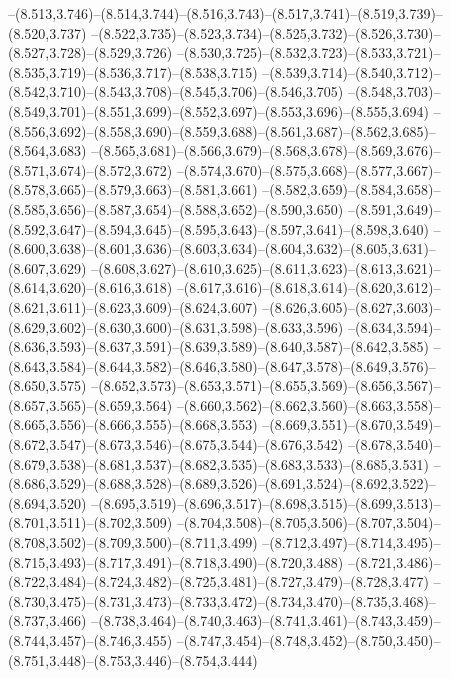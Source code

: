   --(8.513,3.746)--(8.514,3.744)--(8.516,3.743)--(8.517,3.741)--(8.519,3.739)--(8.520,3.737)%
  --(8.522,3.735)--(8.523,3.734)--(8.525,3.732)--(8.526,3.730)--(8.527,3.728)--(8.529,3.726)%
  --(8.530,3.725)--(8.532,3.723)--(8.533,3.721)--(8.535,3.719)--(8.536,3.717)--(8.538,3.715)%
  --(8.539,3.714)--(8.540,3.712)--(8.542,3.710)--(8.543,3.708)--(8.545,3.706)--(8.546,3.705)%
  --(8.548,3.703)--(8.549,3.701)--(8.551,3.699)--(8.552,3.697)--(8.553,3.696)--(8.555,3.694)%
  --(8.556,3.692)--(8.558,3.690)--(8.559,3.688)--(8.561,3.687)--(8.562,3.685)--(8.564,3.683)%
  --(8.565,3.681)--(8.566,3.679)--(8.568,3.678)--(8.569,3.676)--(8.571,3.674)--(8.572,3.672)%
  --(8.574,3.670)--(8.575,3.668)--(8.577,3.667)--(8.578,3.665)--(8.579,3.663)--(8.581,3.661)%
  --(8.582,3.659)--(8.584,3.658)--(8.585,3.656)--(8.587,3.654)--(8.588,3.652)--(8.590,3.650)%
  --(8.591,3.649)--(8.592,3.647)--(8.594,3.645)--(8.595,3.643)--(8.597,3.641)--(8.598,3.640)%
  --(8.600,3.638)--(8.601,3.636)--(8.603,3.634)--(8.604,3.632)--(8.605,3.631)--(8.607,3.629)%
  --(8.608,3.627)--(8.610,3.625)--(8.611,3.623)--(8.613,3.621)--(8.614,3.620)--(8.616,3.618)%
  --(8.617,3.616)--(8.618,3.614)--(8.620,3.612)--(8.621,3.611)--(8.623,3.609)--(8.624,3.607)%
  --(8.626,3.605)--(8.627,3.603)--(8.629,3.602)--(8.630,3.600)--(8.631,3.598)--(8.633,3.596)%
  --(8.634,3.594)--(8.636,3.593)--(8.637,3.591)--(8.639,3.589)--(8.640,3.587)--(8.642,3.585)%
  --(8.643,3.584)--(8.644,3.582)--(8.646,3.580)--(8.647,3.578)--(8.649,3.576)--(8.650,3.575)%
  --(8.652,3.573)--(8.653,3.571)--(8.655,3.569)--(8.656,3.567)--(8.657,3.565)--(8.659,3.564)%
  --(8.660,3.562)--(8.662,3.560)--(8.663,3.558)--(8.665,3.556)--(8.666,3.555)--(8.668,3.553)%
  --(8.669,3.551)--(8.670,3.549)--(8.672,3.547)--(8.673,3.546)--(8.675,3.544)--(8.676,3.542)%
  --(8.678,3.540)--(8.679,3.538)--(8.681,3.537)--(8.682,3.535)--(8.683,3.533)--(8.685,3.531)%
  --(8.686,3.529)--(8.688,3.528)--(8.689,3.526)--(8.691,3.524)--(8.692,3.522)--(8.694,3.520)%
  --(8.695,3.519)--(8.696,3.517)--(8.698,3.515)--(8.699,3.513)--(8.701,3.511)--(8.702,3.509)%
  --(8.704,3.508)--(8.705,3.506)--(8.707,3.504)--(8.708,3.502)--(8.709,3.500)--(8.711,3.499)%
  --(8.712,3.497)--(8.714,3.495)--(8.715,3.493)--(8.717,3.491)--(8.718,3.490)--(8.720,3.488)%
  --(8.721,3.486)--(8.722,3.484)--(8.724,3.482)--(8.725,3.481)--(8.727,3.479)--(8.728,3.477)%
  --(8.730,3.475)--(8.731,3.473)--(8.733,3.472)--(8.734,3.470)--(8.735,3.468)--(8.737,3.466)%
  --(8.738,3.464)--(8.740,3.463)--(8.741,3.461)--(8.743,3.459)--(8.744,3.457)--(8.746,3.455)%
  --(8.747,3.454)--(8.748,3.452)--(8.750,3.450)--(8.751,3.448)--(8.753,3.446)--(8.754,3.444)%
